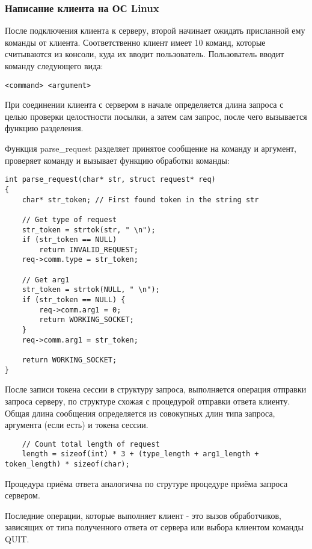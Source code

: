 \subsubsection{Написание клиента на ОС Linux}

После подключения клиента к серверу, второй начинает ожидать присланной ему команды от клиента. Соответственно клиент имеет 10 команд, которые считываются из консоли, куда их вводит пользователь. Пользователь вводит команду следующего вида:

\begin{lstlisting}
<command> <argument>
\end{lstlisting}

При соединении клиента с сервером в начале определяется длина запроса с целью проверки целостности посылки, а затем сам запрос, после чего вызывается функцию разделения. 

Функция parse\_request разделяет принятое сообщение на команду и аргумент, проверяет команду и вызывает функцию обработки команды:

\begin{lstlisting}
int parse_request(char* str, struct request* req)
{
	char* str_token; // First found token in the string str

	// Get type of request
	str_token = strtok(str, " \n");
	if (str_token == NULL)
		return INVALID_REQUEST;
	req->comm.type = str_token;

	// Get arg1
	str_token = strtok(NULL, " \n");
	if (str_token == NULL) {
		req->comm.arg1 = 0;
		return WORKING_SOCKET;
	}
	req->comm.arg1 = str_token;

	return WORKING_SOCKET;
}
\end{lstlisting}

После записи токена сессии в структуру запроса, выполняется операция отправки запроса серверу, по структуре схожая с процедурой отправки ответа клиенту. Общая длина сообщения определяется из совокупных длин типа запроса, аргумента (если есть) и токена сессии.

\begin{lstlisting}
	// Count total length of request
	length = sizeof(int) * 3 + (type_length + arg1_length + token_length) * sizeof(char);
\end{lstlisting}

Процедура приёма ответа аналогична по струтуре процедуре приёма запроса сервером.

Последние операции, которые выполняет клиент - это вызов обработчиков, зависящих от типа полученного ответа от сервера или выбора клиентом команды QUIT.

